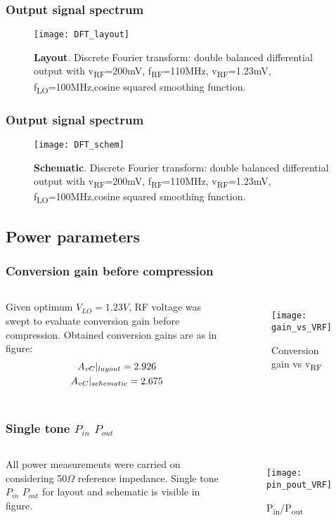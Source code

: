 \begin{frame}
\frametitle{Output signal spectrum}
	\begin{figure}[H]
		\centering
		\texttt{[image: DFT\_layout]}
		\caption{\textbf{Layout}. Discrete Fourier transform: double balanced differential output with v\textsubscript{RF}=200mV,  f\textsubscript{RF}=110MHz, v\textsubscript{RF}=1.23mV, f\textsubscript{LO}=100MHz,cosine squared smoothing function.}
	\end{figure}
\end{frame}

\begin{frame}
\frametitle{Output signal spectrum}
	\begin{figure}[H]
	\centering
	\texttt{[image: DFT\_schem]}
	\caption{\textbf{Schematic}. Discrete Fourier transform: double balanced differential output with v\textsubscript{RF}=200mV,  f\textsubscript{RF}=110MHz, v\textsubscript{RF}=1.23mV, f\textsubscript{LO}=100MHz,cosine squared smoothing function.}
	\end{figure}
\end{frame}

\subsection{Power parameters}
\begin{frame}
\tableofcontents[currentsubsection]
\end{frame}

\begin{frame}
\frametitle{Conversion gain before compression}
\begin{columns}
Given optimum $V_{LO}=1.23V$, RF voltage was swept to evaluate conversion gain before compression. Obtained conversion gains are as in figure:
\begin{gather}
A_{vC}|_{layout}=2.926 \notag \\ 
A_{vC}|_{schematic}=2.675 \notag
\end{gather}
\begin{figure}[H]
	\centering
	\texttt{[image: gain\_vs\_VRF]}
	\caption{Conversion gain vs v\textsubscript{RF}}
	\label{fig:GainvsRF}
\end{figure}
\end{columns}
\end{frame}


\begin{frame}
\frametitle{Single tone $P_{in}$ $P_{out}$}
\begin{columns}
	All power measurements were carried on considering 50$\Omega$ reference impedance. Single tone $P_{in}$ $P_{out}$ for layout and schematic is visible in figure.
	\begin{figure}[H] 
		\centering
		\texttt{[image: pin\_pout\_VRF]}
		\caption{ P\textsubscript{in}/P\textsubscript{out}}
		\label{fig:PinPout}
	\end{figure}
\end{columns}
\end{frame}


